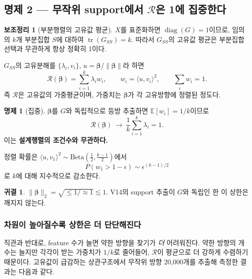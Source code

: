 \documentclass[11pt,a4paper]{article}
\theoremstyle{definition}
\newtheorem{lemma}{보조정리}
\newtheorem{proposition}{명제}
\newtheorem{corollary}{귀결}
\newcommand{\R}{\mathcal{R}}
\newcommand{\bbeta}{\boldsymbol{\beta}}
\begin{document}
\subsection{명제 2 --- 무작위 support에서 \(\R\)은 1에 집중한다}

\begin{lemma}[부분행렬의 고유값 평균]
\(X\)를 표준화하면 \(\operatorname{diag}(G)=1\)이므로, 임의의 \(k\)개 부분집합 \(S\)에 대하여 \(\operatorname{tr}(G_{SS})=k\). 따라서 \(G_{SS}\)의 고유값 평균은 부분집합 선택과 무관하게 항상 정확히 1이다.
\end{lemma}

\(G_{SS}\)의 고유분해를 \(\{\lambda_i,v_i\}\), \(u=\bbeta/\lVert\bbeta\rVert\)라 하면
\[
\R(\bbeta)=\sum_{i=1}^{k}\lambda_i w_i,\qquad w_i=\langle u,v_i\rangle^{2},\qquad \sum_i w_i=1 .
\]
즉 \(\R\)은 고유값의 가중평균이며, 가중치는 \(\bbeta\)가 각 고유방향에 정렬된 정도다.

\begin{proposition}[집중]
\(\bbeta\)를 \(G\)와 독립적으로 등방 추출하면 \(\mathbb{E}[w_i]=1/k\)이므로
\[
\R(\bbeta)\ \longrightarrow\ \frac{1}{k}\sum_{i=1}^{k}\lambda_i=1 .
\]
이는 \textbf{설계행렬의 조건수와 무관하다.}
\end{proposition}

정렬 확률은 \(\langle u,v_1\rangle^{2}\sim\mathrm{Beta}\!\left(\tfrac12,\tfrac{k-1}{2}\right)\)에서
\[
P\!\left(w_1>1-\epsilon\right)\sim\epsilon^{(k-1)/2}
\]
로 \(k\)에 대해 지수적으로 감소한다.

\begin{corollary}
\(\lVert\bbeta\rVert_2=\sqrt{\le1/\approx1}\lesssim1\). V14의 support 추출이 \(G\)와 독립인 한 이 상한은 깨지지 않는다.
\end{corollary}

\subsubsection{차원이 높아질수록 상한은 더 단단해진다}

직관과 반대로, feature 수가 늘면 약한 방향을 찾기가 \emph{더} 어려워진다. 약한 방향의 개수는 늘지만 각각이 받는 가중치가 \(1/k\)로 줄어들어, \(\R\)이 평균으로 더 강하게 수렴하기 때문이다. 고유값이 급감하는 상관구조에서 무작위 방향 20{,}000개를 추출해 측정한 결과는 다음과 같다.
\end{document}
